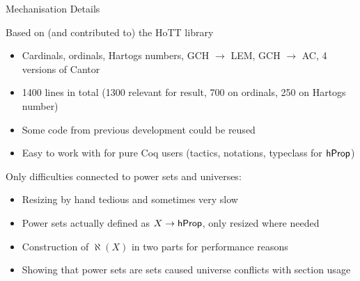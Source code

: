 \documentclass[xcolor=dvipsnames,compress,aspectratio=169,handout]{beamer}
\begin{document}
\begin{frame}{Mechanisation Details}

	\pause
	\vspace{0.25cm}
			Based on (and contributed to) the HoTT library
			\begin{itemize}
				\vspace{0.15cm}
				\item
				Cardinals, ordinals, Hartogs numbers, GCH $\to$ LEM, GCH $\to$ AC, 4 versions of Cantor
				\vspace{0.15cm}
				\item
				1400 lines in total (1300 relevant for result, 700 on ordinals, 250 on Hartogs number)
				\vspace{0.15cm}
				\item
				Some code from previous development could be reused
				\vspace{0.15cm}
				\item
				Easy to work with for pure Coq users (tactics, notations, typeclass for $\mathsf{hProp}$)
			\end{itemize}

	\pause
	\vspace{0.5cm}
	Only difficulties connected to power sets and universes:
	\begin{itemize}
		\vspace{0.15cm}
		\item
		Resizing by hand tedious and sometimes very slow
		\vspace{0.15cm}
		\item
		Power sets actually defined as $X\to\mathsf{hProp}$, only resized where needed
		\vspace{0.15cm}
		\item
		Construction of $\aleph(X)$ in two parts for performance reasons
		\vspace{0.15cm}
		\item
		Showing that power sets are sets caused universe conflicts with section usage
	\end{itemize}
\end{frame}
\end{document}
